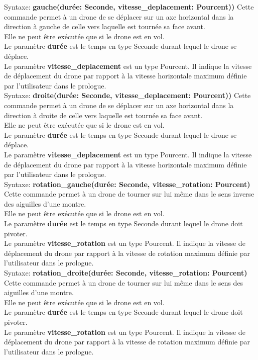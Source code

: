 \documentclass[12pt]{article}
\begin{document}
		\quad Syntaxe: \textbf{gauche(durée: Seconde, vitesse\_deplacement: Pourcent))}  \bigbreak
			Cette commande permet à un drone de se déplacer sur un axe horizontal dans la direction à gauche de celle vers laquelle est tournée sa face avant.  \\
			Elle ne peut être exécutée que si le drone est en vol. \\
			Le paramètre \textbf{durée} est le temps en type Seconde durant lequel le drone se déplace. \\
			Le paramètre \textbf{vitesse\_deplacement} est un type Pourcent. Il indique la vitesse de déplacement du drone par rapport à la vitesse horizontale maximum définie par l'utilisateur dans le prologue.  \\

		\quad Syntaxe: \textbf{droite(durée: Seconde, vitesse\_deplacement: Pourcent))}  \bigbreak
			Cette commande permet à un drone de se déplacer sur un axe horizontal dans la direction à droite de celle vers laquelle est tournée sa face avant. \\
			Elle ne peut être exécutée que si le drone est en vol.\\
			Le paramètre \textbf{durée} est le temps en type Seconde durant lequel le drone se déplace. \\
			Le paramètre \textbf{vitesse\_deplacement} est un type Pourcent. Il indique la vitesse de déplacement du drone par rapport à la vitesse horizontale maximum définie par l'utilisateur dans le prologue.  \\

		\quad Syntaxe: \textbf{rotation\_gauche(durée: Seconde, vitesse\_rotation: Pourcent)}  \bigbreak
			Cette commande permet à un drone de tourner sur lui même dans le sens inverse des aiguilles d'une montre. \\
			Elle ne peut être exécutée que si le drone est en vol.\\
			Le paramètre \textbf{durée} est le temps en type Seconde durant lequel le drone doit pivoter.\\
			Le paramètre \textbf{vitesse\_rotation} est un type Pourcent. Il indique la vitesse de déplacement du drone par rapport à la vitesse de rotation maximum définie par l'utilisateur dans le prologue.  \\


		\quad Syntaxe: \textbf{rotation\_droite(durée: Seconde, vitesse\_rotation: Pourcent)}  \bigbreak
			Cette commande permet à un drone de tourner sur lui même dans le sens des aiguilles d'une montre.\\ 
			Elle ne peut être exécutée que si le drone est en vol.\\
			Le paramètre \textbf{durée} est le temps en type Seconde durant lequel le drone doit pivoter.\\
			Le paramètre \textbf{vitesse\_rotation} est un type Pourcent. Il indique la vitesse de déplacement du drone par rapport à la vitesse de rotation maximum définie par l'utilisateur dans le prologue.  \\
\end{document}
